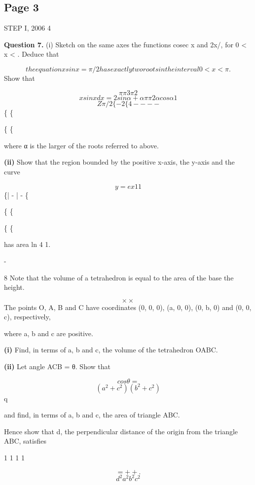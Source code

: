 \documentclass[12pt]{article}
\begin{document}
\subsection*{Page 3}
\begin{flushleft}
STEP I, 2006 4\par
\bigskip\textbf{Question 7.} (i) Sketch on the same axes the functions cosec x and 2x/\pi, for 0 < x < \pi . Deduce that\par
\[the equation x sin x = \pi/2 has exactly two roots in the interval 0 < x < \pi .\]
Show that\par
\[\pi \pi 3\pi 2\]
\[x sin x dx = 2 sin α + α\pi \pi 2α cos α 1\]
\[Z \pi/2 \{ - 2 \{ 4 - - - -\]
\{ \{\par
\{ \{\par
where α is the larger of the roots referred to above.\par
\textbf{(ii)} Show that the region bounded by the positive x-axis, the y-axis and the curve\par
\[y = ex 1 1\]
\{| - | - \{\par
\{ \{\par
\{ \{\par
has area ln 4 1.\par
-\par
8 Note that the volume of a tetrahedron is equal to the area of the base the height.\par
\[\times \times\]
The points O, A, B and C have coordinates (0, 0, 0), (a, 0, 0), (0, b, 0) and (0, 0, c), respectively,\par
where a, b and c are positive.\par
\textbf{(i)} Find, in terms of a, b and c, the volume of the tetrahedron OABC.\par
\textbf{(ii)} Let angle ACB = θ. Show that\par
\[cos θ =\]
\[(a^2 + c^2)(b^2 + c^2)\]
q\par
and find, in terms of a, b and c, the area of triangle ABC.\par
Hence show that d, the perpendicular distance of the origin from the triangle ABC, satisfies\par
1 1 1 1\par
\[= + + .\]
\[d^2 a^2 b^2 c^2\]
\end{flushleft}
\end{document}
